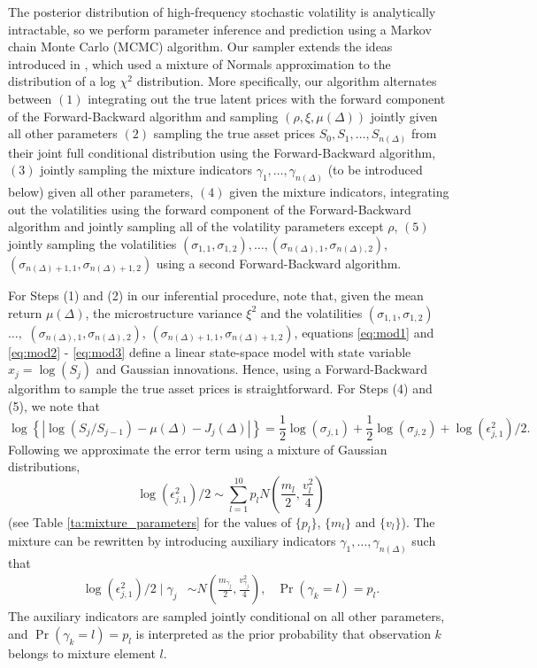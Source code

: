 The posterior distribution of high-frequency stochastic volatility is analytically intractable, so we perform parameter inference and prediction using a Markov chain Monte Carlo (MCMC) algorithm.  Our sampler extends the ideas introduced in \cite{omori2007stochastic}, which used a mixture of Normals approximation to the distribution of a log $\chi^2$ distribution.  More specifically, our algorithm alternates between $(1)$ integrating out the true latent prices with the forward component of the Forward-Backward algorithm \citep{carter1994gibbs,fruhwirth1994data} and sampling $(\rho, \xi, \mu(\Delta))$ jointly given all other parameters $(2)$ sampling the true asset prices $S_0, S_1, \ldots, S_{n(\Delta)}$ from their joint full conditional distribution using the Forward-Backward algorithm, $(3)$ jointly sampling the mixture indicators $\gamma_1, \ldots, \gamma_{n(\Delta)}$ (to be introduced below) given all other parameters, $(4)$ given the mixture indicators, integrating out the volatilities using the forward component of the Forward-Backward algorithm and jointly sampling all of the volatility parameters except $\rho$, $(5)$ jointly sampling the volatilities $(\sigma_{1,1},\sigma_{1,2}), \ldots, (\sigma_{n(\Delta),1}, \sigma_{n(\Delta),2})$, $(\sigma_{n(\Delta) + 1,1}, \sigma_{n(\Delta) + 1,2})$ using a second Forward-Backward algorithm.

For Steps (1) and (2) in our inferential procedure, note that, given the mean return $\mu(\Delta)$, the microstructure variance $\xi^2$ and the volatilities $(\sigma_{1,1},\sigma_{1,2})$ $\ldots,$ $(\sigma_{n(\Delta),1}, \sigma_{n(\Delta),2})$, $(\sigma_{n(\Delta) + 1,1}, \sigma_{n(\Delta) + 1,2})$, equations \eqref{eq:mod1} and \eqref{eq:mod2} - \eqref{eq:mod3} define a linear state-space model with state variable $x_j = \log (S_j)$ and Gaussian innovations.  Hence, using a Forward-Backward algorithm to sample the true asset prices is straightforward.  For Steps (4) and (5), we note that
\[
\log\left\{ | \log(S_j / S_{j -1}) - \mu(\Delta) - J_j(\Delta) | \right\} = \frac{1}{2}\log(\sigma_{j,1}) + \frac{1}{2}\log(\sigma_{j,2}) + \log( \epsilon^2_{j,1} )/2 .
\]
Following \cite{omori2007stochastic} we approximate the error term using a mixture of Gaussian distributions,
$$
\log( \epsilon^2_{j,1} )/2 \sim \sum_{l=1}^{10} p_l N \left( \frac{m_l}{2}, \frac{v_l^2}{4} \right)
$$
(see Table \ref{ta:mixture_parameters} for the values of $\{ p_l \}$, $\{ m_l \}$ and $\{ v_l \}$).  The mixture can be rewritten by introducing auxiliary indicators $\gamma_1, \ldots, \gamma_{n(\Delta)}$ such that
\begin{align*}
\log( \epsilon^2_{j,1} )/2 \mid \gamma_j &\sim N \left( \frac{m_{\gamma_j}}{2}, \frac{v_{\gamma_j}^2}{4} \right)   ,   &   \Pr(\gamma_k = l) = p_l .
\end{align*}
The auxiliary indicators are sampled jointly conditional on all other parameters, and $\Pr(\gamma_k = l) = p_l$ is interpreted as the prior probability that observation $k$ belongs to mixture element $l$.

